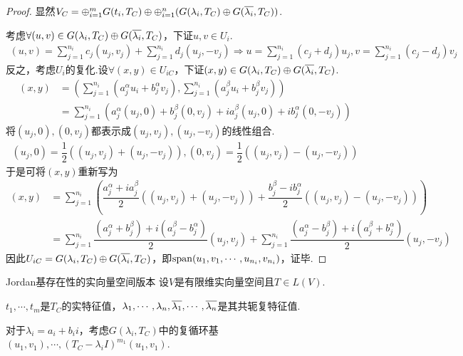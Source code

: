 \begin{proof}
    显然\(V_C=\oplus_{i=1}^m G(t_i,T_C) \oplus \oplus_{i=1}^n (G(\lambda_i,T_C) \oplus G(\overline{\lambda_i},T_C))\).

    考虑\(\forall (u,v) \in G(\lambda_i,T_C) \oplus G(\overline{\lambda_i},T_C)\)，下证\(u,v \in U_i\).
    \begin{align*}
        (u,v)=\sum_{j=1}^{n_i} c_j(u_j,v_j)+\sum_{j=1}^{n_i} d_j(u_j,-v_j) \Rightarrow
        u=\sum_{j=1}^{n_i} (c_j+d_j)u_j,v=\sum_{j=1}^{n_i} (c_j-d_j)v_j
    \end{align*}
    反之，考虑\(U_i\)的复化.设\(\forall (x,y) \in U_{iC}\)，下证\((x,y) \in G(\lambda_i,T_C) \oplus G(\overline{\lambda_i},T_C)\).
    \begin{align*}
        (x,y)&=(\sum_{j=1}^{n_i}(a_j^\alpha u_i+b_j^\alpha v_j),\sum_{j=1}^{n_i}(a_j^\beta u_i+b_j^\beta v_j)) \\
                &=\sum_{j=1}^{n_i}(a_j^\alpha (u_j,0)+b_j^\beta (0,v_j)+i a_j^\beta (u_j,0)+i b_j^\alpha (0,-v_j))
    \end{align*}
    将\((u_j,0),(0,v_j)\)都表示成\((u_j,v_j),(u_j,-v_j)\)的线性组合.
    \begin{align*}
        (u_j,0)=\dfrac{1}{2}((u_j,v_j)+(u_j,-v_j)),(0,v_j)=\dfrac{1}{2}((u_j,v_j)-(u_j,-v_j))
    \end{align*}
    于是可将\((x,y)\)重新写为
    \begin{align*}
        (x,y)&=\sum_{j=1}^{n_i}(\dfrac{a_j^\alpha+i a_j^\beta}{2}((u_j,v_j)+(u_j,-v_j))+
        \dfrac{b_j^\beta-i b_j^\alpha}{2}((u_j,v_j)-(u_j,-v_j))) \\
        &=\sum_{j=1}^{n_i} \dfrac{(a_j^\alpha+b_j^\beta)+i(a_j^\beta-b_j^\alpha)}{2}(u_j,v_j)+
        \sum_{j=1}^{n_i} \dfrac{(a_j^\alpha-b_j^\beta)+i(a_j^\beta+b_j^\alpha)}{2}(u_j,-v_j)
    \end{align*}
    因此\(U_{iC}=G(\lambda_i,T_C) \oplus G(\overline{\lambda_i},T_C)\)，即\(\operatorname{span}(u_1,v_1,\cdots,u_{n_i},v_{n_i})\)，证毕.
\end{proof}

\newpage

\begin{theorem}[9.2*]\label{thm 9.2*} Jordan基存在性的实向量空间版本 \:
    设\(V\)是有限维实向量空间且\(T \in L(V)\).

    \(t_1,\cdots,t_m\)是\(T_C\)的实特征值，\(\lambda_1,\cdots,\lambda_n,\overline{\lambda_1},\cdots,\overline{\lambda_n}\)是其共轭复特征值.
    
    对于\(\lambda_i=a_i+b_i i\)，考虑\(G(\lambda_i,T_C)\)中的复循环基\((u_1,v_1),\cdots,(T_C-\lambda_i I)^{m_1}(u_1,v_1)\).
\end{theorem}

